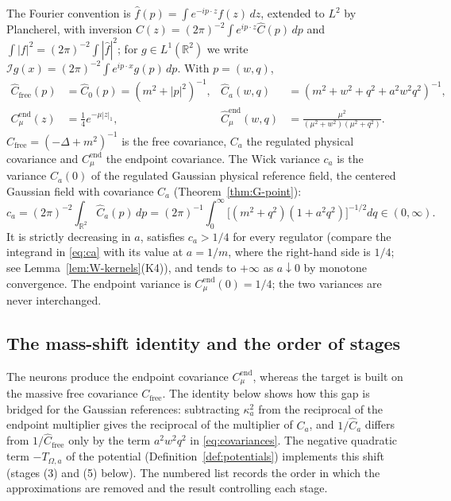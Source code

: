 \documentclass[11pt]{article}
\theoremstyle{plain}
\theoremstyle{definition}
\theoremstyle{remark}
\newcommand{\R}{\mathbb{R}}
\newcommand{\cI}{\mathcal{I}}
\newcommand{\Cend}{C^{\mathrm{end}}_{\mu}}
\newcommand{\hCend}{\hat C^{\mathrm{end}}_{\mu}}
\newcommand{\Cfree}{C_{\mathrm{free}}}
\begin{document}
The Fourier convention is $\hat f(p)=\int e^{-ip\cdot z}f(z)\,dz$, extended to
$L^{2}$ by Plancherel, with inversion $C(z)=(2\pi)^{-2}\int e^{ip\cdot z}\hat
C(p)\,dp$ and $\int|f|^{2}=(2\pi)^{-2}\int|\hat f|^{2}$; for $g\in L^{1}(\R^{2})$ we write
$\cI g(x)=(2\pi)^{-2}\int e^{ip\cdot x}g(p)\,dp$. With $p=(w,q)$,
\begin{align}
\hat\Cfree(p)&=\hat C_0(p)=(m^{2}+|p|^{2})^{-1}, &
\hat C_a(w,q)&=(m^{2}+w^{2}+q^{2}+a^{2}w^{2}q^{2})^{-1},\label{eq:covariances}\\
\Cend(z)&=\tfrac14 e^{-\mu|z|_{1}}, &
\hCend(w,q)&=\frac{\mu^{2}}{(\mu^{2}+w^{2})(\mu^{2}+q^{2})}.
\nonumber
\end{align}
$\Cfree=(-\Delta+m^{2})^{-1}$ is the free covariance, $C_a$ the regulated
physical covariance and $\Cend$ the endpoint covariance. The Wick variance $c_a$
is the variance $C_a(0)$ of the regulated Gaussian physical reference field, the
centered Gaussian field with covariance $C_a$ (Theorem~\ref{thm:G-point}):
\begin{equation}\label{eq:ca}
c_a=(2\pi)^{-2}\int_{\R^{2}}\hat C_a(p)\,dp
=(2\pi)^{-1}\int_{0}^{\infty}\bigl[(m^{2}+q^{2})(1+a^{2}q^{2})\bigr]^{-1/2}dq\in(0,\infty).
\end{equation}
It is strictly decreasing in $a$, satisfies $c_a>1/4$ for every regulator
(compare the integrand in \eqref{eq:ca} with its value at $a=1/m$, where the right-hand side is $1/4$; see Lemma~\ref{lem:W-kernels}(K4)), and tends to $+\infty$ as $a\downarrow0$ by monotone
convergence. The endpoint variance is $\Cend(0)=1/4$; the two variances are
never interchanged.

\subsection{The mass-shift identity and the order of stages}\label{sec:massshift}

The neurons produce the endpoint covariance $\Cend$, whereas the target is built on the massive free covariance $\Cfree$. The identity below shows how this gap is bridged for the Gaussian references: subtracting $\kappa_a^{2}$ from the reciprocal of the endpoint multiplier gives the reciprocal of the multiplier of $C_a$, and $1/\hat C_a$ differs from $1/\hat\Cfree$ only by the term $a^{2}w^{2}q^{2}$ in \eqref{eq:covariances}. The negative quadratic term $-T_{\Omega,a}$ of the potential (Definition~\ref{def:potentials}) implements this shift (stages (3) and (5) below). The numbered list records the order in which the approximations are removed and the result controlling each stage.
\end{document}
